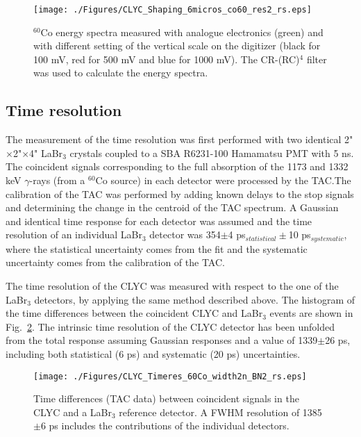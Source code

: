 \documentclass[review,number,sort&compress]{elsarticle}
\begin{document}
\begin{figure}[h!]
\centering
\texttt{[image: ./Figures/CLYC\_Shaping\_6micros\_co60\_res2\_rs.eps]} %
\caption{$^{60}$Co energy spectra measured with analogue electronics (green) and with different setting of the vertical scale on the digitizer (black for 100 mV, red for 500 mV and blue for 1000 mV). The CR-(RC)$^{4}$ filter was used to calculate the energy spectra. }
\label{res_rc4}
\end{figure}


\subsection{Time resolution}
 
The measurement of the time resolution was first performed with two identical 2"$\times$2"$\times$4" LaBr$_{3}$ crystals coupled to a SBA R6231-100 Hamamatsu PMT with 5 ns. The coincident signals corresponding to the full absorption of the 1173 and 1332 keV $\gamma$-rays (from a $^{60}$Co source) in each detector were processed by the TAC.The calibration of the TAC was performed by adding known delays to the stop signals and determining the change in the centroid of the TAC spectrum. A Gaussian and identical time response for each detector was assumed and the time resolution of an individual LaBr$_{3}$ detector was 354$\pm$4 ps$_{statistical}\pm$10 ps$_{systematic}$, where the statistical uncertainty comes from the fit and the systematic uncertainty comes from the calibration of the TAC.    

The time resolution of the CLYC was measured with respect to the one of the LaBr$_{3}$ detectors, by applying the same method described above. The histogram of the time differences between the coincident CLYC and LaBr$_{3}$ events are shown in Fig.~\ref{time}. The intrinsic time resolution of the CLYC detector has been unfolded from the total response assuming Gaussian responses and a value of 1339$\pm$26 ps, including both statistical (6 ps) and systematic (20 ps) uncertainties.

\begin{figure}[h!]
\centering
\texttt{[image: ./Figures/CLYC\_Timeres\_60Co\_width2n\_BN2\_rs.eps]}
\caption{Time differences (TAC data) between coincident signals in the CLYC and a LaBr$_{3}$ reference detector. A FWHM resolution of 1385$\pm$6 ps includes the contributions of the individual detectors.}
\label{time}
\end{figure}
\end{document}
